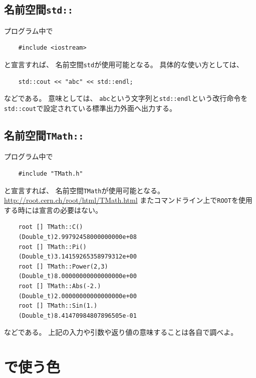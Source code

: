 \documentclass{jarticle}
\begin{document}
  \subsection{名前空間\texttt{std::}}
  プログラム中で
\begin{verbatim}
	#include <iostream>
\end{verbatim}
と宣言すれば、
名前空間\texttt{std}が使用可能となる。
具体的な使い方としては、
\begin{verbatim}
	std::cout << "abc" << std::endl;
\end{verbatim}
などである。
意味としては、
\verb|abc|という文字列と\verb|std::endl|という改行命令を\verb|std::cout|で設定されている標準出力外面へ出力する。


  \subsection{名前空間\texttt{TMath::}}
  プログラム中で
\begin{verbatim}
	#include "TMath.h"
\end{verbatim}
と宣言すれば、
名前空間\texttt{TMath}が使用可能となる。
\url{http://root.cern.ch/root/html/TMath.html}
またコマンドライン上で\verb|ROOT|を使用する時には宣言の必要はない。
\begin{verbatim}
	root [] TMath::C()
	(Double_t)2.99792458000000000e+08
	root [] TMath::Pi()
	(Double_t)3.14159265358979312e+00
	root [] TMath::Power(2,3)
	(Double_t)8.00000000000000000e+00
	root [] TMath::Abs(-2.)
	(Double_t)2.00000000000000000e+00
	root [] TMath::Sin(1.)
	(Double_t)8.41470984807896505e-01
\end{verbatim}
などである。
上記の入力や引数や返り値の意味することは各自で調べよ。


 \section{\ROOT で使う色}
\end{document}
